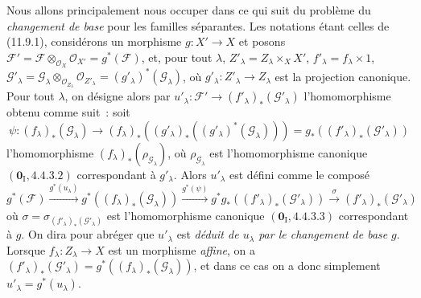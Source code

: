 \begin{env}[11.9.5]
\label{IV.11.9.5-fr}
Nous allons principalement nous occuper dans ce qui suit du problème du
\emph{changement de base} pour les familles séparantes. Les notations étant
celles de (11.9.1), considérons un morphisme $g:X'\to X$ et posons
$\mathcal F'=\mathcal F\otimes_{\mathcal O_X}\mathcal O_{X'}
=g^*(\mathcal F)$, et, pour tout $\lambda$,
$Z'_\lambda=Z_\lambda\times_X X'$, $f'_\lambda=f_\lambda\times 1$,
$\mathcal G'_\lambda=\mathcal G_\lambda\otimes_{\mathcal O_{Z_\lambda}}
\mathcal O_{Z'_\lambda}=(g'_\lambda)^*(\mathcal G_\lambda)$, où
$g'_\lambda:Z'_\lambda\to Z_\lambda$ est la projection canonique. Pour tout
$\lambda$, on désigne alors par
$u'_\lambda:\mathcal F'\to(f'_\lambda)_*(\mathcal G'_\lambda)$
l'homomorphisme obtenu comme suit~: soit
\[
\psi:(f_\lambda)_*(\mathcal G_\lambda)\longrightarrow
(f_\lambda)_*((g'_\lambda)_*((g'_\lambda)^*(\mathcal G_\lambda)))
=g_*((f'_\lambda)_*(\mathcal G'_\lambda))
\]
l'homomorphisme $(f_\lambda)_*(\rho_{\mathcal G_\lambda})$, où
$\rho_{\mathcal G_\lambda}$ est l'homomorphisme canonique
$(\mathbf 0_{\mathrm I},4.4.3.2)$ correspondant à $g'_\lambda$. Alors
$u'_\lambda$ est défini comme le composé
\[
g^*(\mathcal F)\xrightarrow{g^*(u_\lambda)}
g^*((f_\lambda)_*(\mathcal G_\lambda))
\xrightarrow{g^*(\psi)}g^*g_*((f'_\lambda)_*(\mathcal G'_\lambda))
\xrightarrow{\sigma}(f'_\lambda)_*(\mathcal G'_\lambda)
\]
où $\sigma=\sigma_{(f'_\lambda)_*(\mathcal G'_\lambda)}$ est
l'homomorphisme canonique $(\mathbf 0_{\mathrm I},4.4.3.3)$ correspondant à
$g$. On dira pour abréger que $u'_\lambda$ est \emph{déduit de $u_\lambda$
par le changement de base} $g$. Lorsque $f_\lambda:Z_\lambda\to X$ est un
morphisme \emph{affine}, on a
$(f'_\lambda)_*(\mathcal G'_\lambda)=g^*((f_\lambda)_*(\mathcal G_\lambda))$,
et dans ce cas on a donc simplement $u'_\lambda=g^*(u_\lambda)$.


\end{env}

